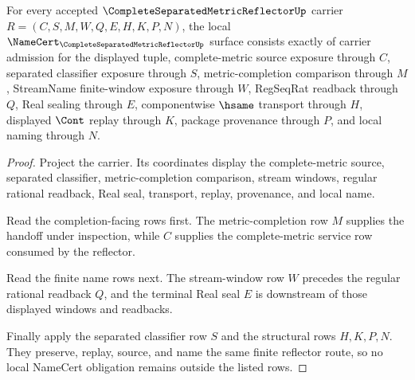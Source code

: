 \begin{theorem}
\label{thm:complete-separated-metric-reflector-namecert-obligations}
For every accepted $\CompleteSeparatedMetricReflectorUp$ carrier $R=(C,S,M,W,Q,E,H,K,P,N)$, the local $\NameCert_{\CompleteSeparatedMetricReflectorUp}$ surface consists exactly of carrier admission for the displayed tuple, complete-metric source exposure through $C$, separated classifier exposure through $S$, metric-completion comparison through $M$, StreamName finite-window exposure through $W$, RegSeqRat readback through $Q$, Real sealing through $E$, componentwise $\hsame$ transport through $H$, displayed $\Cont$ replay through $K$, package provenance through $P$, and local naming through $N$.
\end{theorem}
\begin{proof}
Project the carrier. Its coordinates display the complete-metric source, separated classifier, metric-completion comparison, stream windows, regular rational readback, Real seal, transport, replay, provenance, and local name.

Read the completion-facing rows first. The metric-completion row $M$ supplies the handoff under inspection, while $C$ supplies the complete-metric service row consumed by the reflector.

Read the finite name rows next. The stream-window row $W$ precedes the regular rational readback $Q$, and the terminal Real seal $E$ is downstream of those displayed windows and readbacks.

Finally apply the separated classifier row $S$ and the structural rows $H,K,P,N$. They preserve, replay, source, and name the same finite reflector route, so no local NameCert obligation remains outside the listed rows.
\end{proof}

